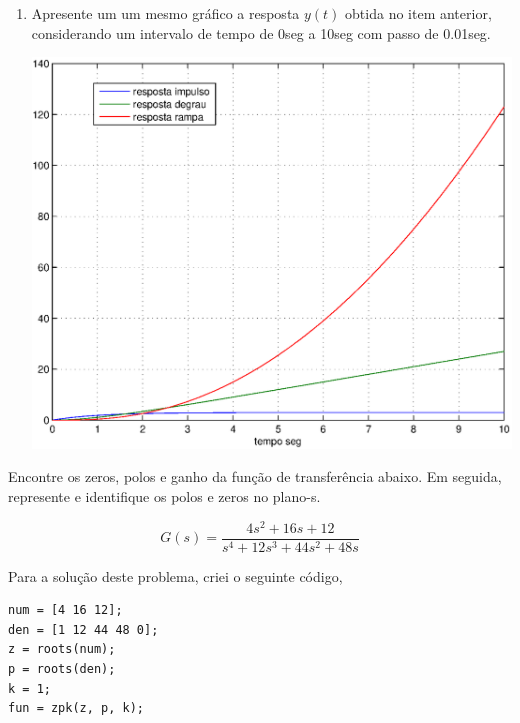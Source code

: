 \documentclass[a4paper, 10pt]{article}
\begin{document}
\begin{list}{\textbf{Questão .}}{
\setlength{\labelwidth}{-2mm} \setlength{\parsep}{0mm}
\setlength{\topsep}{0mm} \setlength{\leftmargin}{0mm}}
\begin{enumerate}
            \newpage
         \item 
             Apresente um um mesmo gráfico a resposta $y(t)$  obtida no item anterior, 
             considerando um intervalo de tempo de 0seg a 10seg com passo de 0.01seg.
 
             \begin{center}
                \includegraphics[scale=0.6]{fig2q.eps}
             \end{center}


    \end{enumerate}

\newpage

\item
    Encontre os zeros, polos e ganho da função de transferência abaixo. Em seguida, 
    represente e identifique os polos e zeros no plano-s.

    $$
    G(s) = \frac{4 s^2 + 16 s + 12}{s^4 + 12 s^3 +  44 s^2 + 48 s}
    $$


    Para a solução deste problema, criei o seguinte código,

 
     \begin{lstlisting}
num = [4 16 12];
den = [1 12 44 48 0];
z = roots(num);
p = roots(den);
k = 1;
fun = zpk(z, p, k);
     \end{lstlisting}


\end{list}
\end{document}
